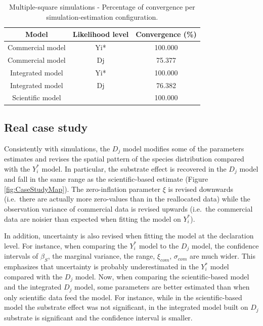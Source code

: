 \documentclass[
  english,
  man,floatsintext]{apa6}
\begin{document}
\begin{table}

\caption{\label{tab:unnamed-chunk-8}Multiple-square simulations - Percentage of convergence per simulation-estimation configuration.}
\centering
\begin{tabular}[t]{ccc}
\toprule
Model & Likelihood level & Convergence (\%)\\
\midrule
Commercial model & Yi* & 100.000\\
Commercial model & Dj & 75.377\\
Integrated model & Yi* & 100.000\\
Integrated model & Dj & 76.382\\
Scientific model &  & 100.000\\
\bottomrule
\end{tabular}
\end{table}

\hypertarget{real-case-study}{%
\subsection{Real case study}\label{real-case-study}}

Consistently with simulations, the \(D_j\) model modifies some of the parameters estimates and revises the spatial pattern of the species distribution compared with the \(Y^*_i\) model. In particular, the substrate effect is recovered in the \(D_j\) model and fall in the same range as the scientific-based estimate (Figure \ref{fig:CaseStudyMap}). The zero-inflation parameter \(\xi\) is revised downwards (i.e.~there are actually more zero-values than in the reallocated data) while the observation variance of commercial data is revised upwards (i.e.~the commercial data are noisier than expected when fitting the model on \(Y_i^*\)).

In addition, uncertainty is also revised when fitting the model at the declaration level. For instance, when comparing the \(Y^*_i\) model to the \(D_j\) model, the confidence intervals of \(\beta_S\), the marginal variance, the range, \(\xi_{com}\), \(\sigma_{com}\) are much wider. This emphasizes that uncertainty is probably underestimated in the \(Y^*_i\) model compared with the \(D_j\) model. Now, when comparing the scientific-based model and the integrated \(D_j\) model, some parameters are better estimated than when only scientific data feed the model. For instance, while in the scientific-based model the substrate effect was not significant, in the integrated model built on \(D_j\) substrate is significant and the confidence interval is smaller.
\end{document}
